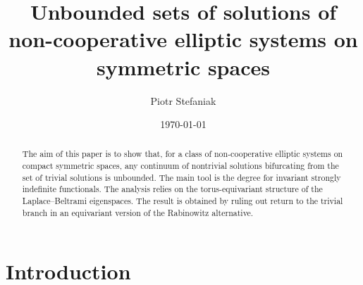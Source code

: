\documentclass[reqno,twoside,12pt]{amsart}
\numberwithin{equation}{section} \errorcontextlines=0
\begin{document}
\title[Unbounded sets of solutions]{Unbounded sets of solutions of non-cooperative elliptic systems on symmetric spaces}

\author{Piotr Stefaniak}
\address{Faculty of Mathematics and Computer Science \\ Nicolaus Copernicus University in Toru\'n\\
PL-87-100 Toru\'{n} \\ ul. Chopina $12 \slash 18$ \\
Poland}






\date{\today}



\begin{abstract}
The aim of this paper is to show that, for a class of non-cooperative elliptic systems on compact symmetric spaces, any continuum of nontrivial solutions bifurcating from the set of trivial solutions is unbounded. The main tool is the degree for invariant strongly indefinite functionals. The analysis relies on the torus-equivariant structure of the Laplace--Beltrami eigenspaces. The result is obtained by ruling out return to the trivial branch in an equivariant version of the Rabinowitz alternative.
\end{abstract}





\maketitle
\section{Introduction}
\end{document}

